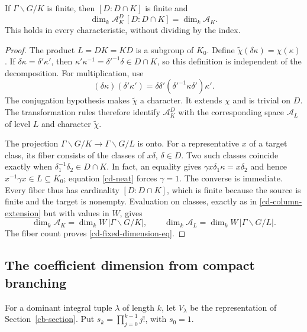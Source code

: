 \begin{proposition}\label{cd-fixed-dimension}
If $\Gamma\backslash G/K$ is finite, then $[D:D\cap K]$ is
finite and
\begin{equation}\label{cd-fixed-dimension-eq}
                   \dim_k\mathcal A_K^D\,[D:D\cap K]
                                     =\dim_k\mathcal A_K.
\end{equation}
This holds in every characteristic, without dividing by the index.
\end{proposition}
\begin{proof}
The product $L=DK=KD$ is a subgroup of $K_0$. Define
$\widetilde\chi(\delta\kappa)=\chi(\kappa)$.
If $\delta\kappa=\delta'\kappa'$, then
$\kappa'\kappa^{-1}=\delta'^{-1}\delta\in D\cap K$,
so this definition is independent of the decomposition.
For multiplication, use
\[
 (\delta\kappa)(\delta'\kappa')
         =\delta\delta'(\delta'^{-1}\kappa\delta')\kappa'.
\]
The conjugation hypothesis makes $\widetilde\chi$ a character.
It extends $\chi$ and is trivial on $D$. The transformation
rules therefore identify $\mathcal A_K^D$ with the corresponding
space $\mathcal A_L$ of level $L$ and character
$\widetilde\chi$.

The projection
$\Gamma\backslash G/K\to\Gamma\backslash G/L$ is onto.
For a representative $x$ of a target class, its fiber consists of
the classes of $x\delta$, $\delta\in D$. Two such classes
coincide exactly when $\delta_1^{-1}\delta_2\in D\cap K$.
In fact, an equality gives
$\gamma x\delta_1\kappa=x\delta_2$ and hence
$x^{-1}\gamma x\in L\subseteq K_0$; equation
\eqref{cd-neat} forces $\gamma=1$.
The converse is immediate. Every fiber thus has cardinality
$[D:D\cap K]$, which is finite because the source is finite and
the target is nonempty. Evaluation on classes, exactly as in
\eqref{cd-column-extension} but with values in $W$, gives
\[
 \dim_k\mathcal A_K=\dim_k W\,|\Gamma\backslash G/K|,
 \qquad
 \dim_k\mathcal A_L=\dim_k W\,|\Gamma\backslash G/L|.
\]
The fiber count proves \eqref{cd-fixed-dimension-eq}.
\end{proof}

\subsection{The coefficient dimension from compact branching}

For a dominant integral tuple $\lambda$ of length $k$, let
$V_\lambda$ be the representation of Section~\ref{cb-section}.
Put $s_k=\prod_{j=0}^{k-1}j!$, with $s_0=1$.

